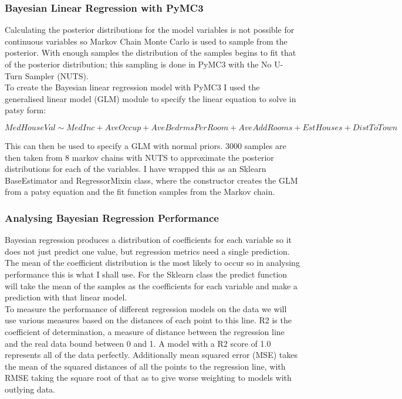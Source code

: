 \documentclass[11pt]{article}
\begin{document}
\subsubsection{Bayesian Linear Regression with PyMC3}

Calculating the posterior distributions for the model variables is not possible for continuous variables so Markov Chain Monte Carlo is used to sample from the posterior. With enough samples the distribution of the samples begins to fit that of the posterior distribution; this sampling is done in PyMC3 with the No U-Turn Sampler (NUTS). \\

To create the Bayesian linear regression model with PyMC3 I used the generalised linear model (GLM) module to specify the linear equation to solve in patsy form:

\[ MedHouseVal \sim MedInc + AveOccup + AveBedrmsPerRoom + AveAddRooms + EstHouses + DistToTown \]

This can then be used to specify a GLM with normal priors. 3000 samples are then taken from 8 markov chains with NUTS to approximate the posterior distributions for each of the variables. I have wrapped this as an Sklearn BaseEstimator and RegressorMixin class, where the constructor creates the GLM from a patsy equation and the fit function samples from the Markov chain. 

\subsubsection{Analysing Bayesian Regression Performance}

Bayesian regression produces a distribution of coefficients for each variable so it does not just predict one value, but regression metrics need a single prediction. The mean of the coefficient distribution is the most likely to occur so in analysing performance this is what I shall use. For the Sklearn class the predict function will take the mean of the samples as the coefficients for each variable and make a prediction with that linear model. \\

To measure the performance of different regression models on the data we will use various measures based on the distances of each point to this line. R2 is the coefficient of determination, a measure of distance between the regression line and the real data bound between 0 and 1. A model with a R2 score of 1.0 represents all of the data perfectly. Additionally mean squared error (MSE) takes the mean of the squared distances of all the points to the regression line, with RMSE taking the square root of that as to give worse weighting to models with outlying data. \\
\end{document}
